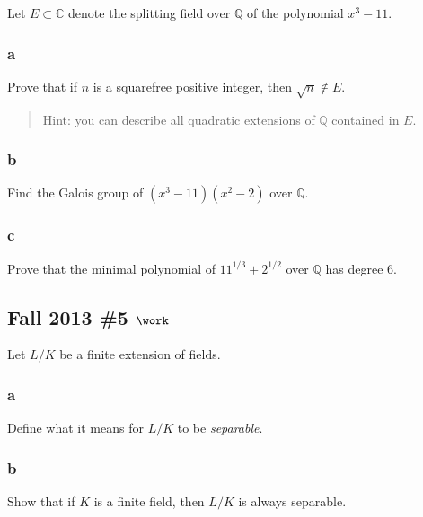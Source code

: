 Let \(E\subset {\mathbb{C}}\) denote the splitting field over
\({\mathbb{Q}}\) of the polynomial \(x^3 - 11\).

\hypertarget{a-77}{%
\subsubsection{a}\label{a-77}}

Prove that if \(n\) is a squarefree positive integer, then
\(\sqrt{n}\not\in E\).

\begin{quote}
Hint: you can describe all quadratic extensions of \({\mathbb{Q}}\)
contained in \(E\).
\end{quote}

\hypertarget{b-67}{%
\subsubsection{b}\label{b-67}}

Find the Galois group of \((x^3 - 11)(x^2 - 2)\) over \({\mathbb{Q}}\).

\hypertarget{c-44}{%
\subsubsection{c}\label{c-44}}

Prove that the minimal polynomial of \(11^{1/3} + 2^{1/2}\) over
\({\mathbb{Q}}\) has degree 6.

\hypertarget{fall-2013-5-work}{%
\subsection{\texorpdfstring{Fall 2013 \#5
\(\work\)}{Fall 2013 \#5 \textbackslash work}}\label{fall-2013-5-work}}

Let \(L/K\) be a finite extension of fields.

\hypertarget{a-78}{%
\subsubsection{a}\label{a-78}}

Define what it means for \(L/K\) to be \emph{separable}.

\hypertarget{b-68}{%
\subsubsection{b}\label{b-68}}

Show that if \(K\) is a finite field, then \(L/K\) is always separable.

